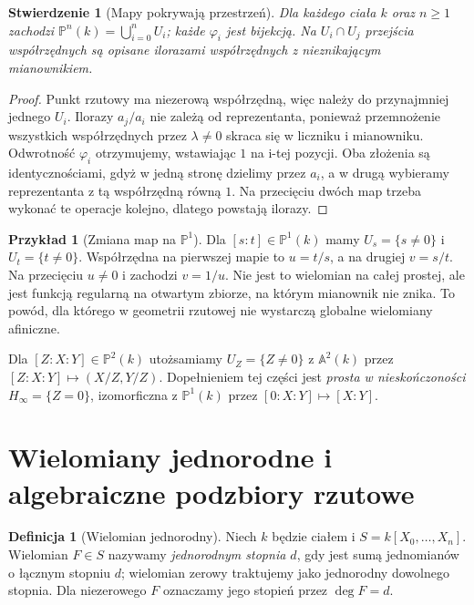 \documentclass[11pt,a4paper,openany]{report}
\numberwithin{equation}{section}
\theoremstyle{plain}
\newtheorem{stwierdzenie}[twierdzenie]{Stwierdzenie}
\theoremstyle{definition}
\newtheorem{definicja}[twierdzenie]{Definicja}
\newtheorem{przyklad}[twierdzenie]{Przykład}
\theoremstyle{remark}
\newcommand{\A}{\mathbb A}
\newcommand{\PP}{\mathbb P}
\begin{document}
\begin{stwierdzenie}[Mapy pokrywają przestrzeń]
Dla każdego ciała $k$ oraz $n\ge1$ zachodzi
$\PP^n(k)=\bigcup_{i=0}^n U_i$; każde $\varphi_i$
jest bijekcją. Na $U_i\cap U_j$ przejścia współrzędnych
są opisane ilorazami współrzędnych z nieznikającym mianownikiem.
\end{stwierdzenie}
\begin{proof}
Punkt rzutowy ma niezerową współrzędną, więc należy do
przynajmniej jednego $U_i$. Ilorazy $a_j/a_i$ nie zależą
od reprezentanta, ponieważ przemnożenie wszystkich współrzędnych
przez $\lambda\ne0$ skraca się w liczniku i mianowniku.
Odwrotność $\varphi_i$ otrzymujemy, wstawiając $1$ na
i-tej pozycji. Oba złożenia są identycznościami, gdyż w jedną
stronę dzielimy przez $a_i$, a w drugą wybieramy reprezentanta
z tą współrzędną równą $1$. Na przecięciu dwóch map trzeba
wykonać te operacje kolejno, dlatego powstają ilorazy.
\end{proof}

\begin{przyklad}[Zmiana map na $\PP^1$]
Dla $[s:t]\in\PP^1(k)$ mamy $U_s=\{s\ne0\}$ i
$U_t=\{t\ne0\}$. Współrzędna na pierwszej mapie to
$u=t/s$, a na drugiej $v=s/t$. Na przecięciu $u\ne0$
i zachodzi $v=1/u$. Nie jest to wielomian na całej prostej,
ale jest funkcją regularną na otwartym zbiorze, na którym
mianownik nie znika. To powód, dla którego w geometrii
rzutowej nie wystarczą globalne wielomiany afiniczne.
\end{przyklad}

Dla $[Z:X:Y]\in\PP^2(k)$ utożsamiamy
$U_Z=\{Z\ne0\}$ z $\A^2(k)$ przez
$[Z:X:Y]\mapsto(X/Z,Y/Z)$. Dopełnieniem tej części
jest \emph{prosta w nieskończoności} $H_\infty=\{Z=0\}$,
izomorficzna z $\PP^1(k)$ przez $[0:X:Y]\mapsto[X:Y]$.

\section{Wielomiany jednorodne i algebraiczne podzbiory rzutowe}

\begin{definicja}[Wielomian jednorodny]
Niech $k$ będzie ciałem i $S=k[X_0,\ldots,X_n]$.
Wielomian $F\in S$ nazywamy \emph{jednorodnym stopnia $d$},
gdy jest sumą jednomianów o łącznym stopniu $d$; wielomian
zerowy traktujemy jako jednorodny dowolnego stopnia.
Dla niezerowego $F$ oznaczamy jego stopień przez $\deg F=d$.
\end{definicja}
\end{document}
